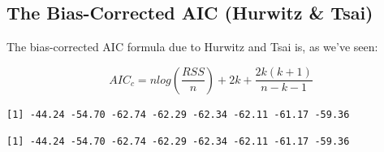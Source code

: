 \documentclass[]{book}
\newenvironment{Shaded}{\begin{snugshade}}{\end{snugshade}}
\newcommand{\KeywordTok}[1]{\textcolor[rgb]{0.13,0.29,0.53}{\textbf{#1}}}
\newcommand{\DecValTok}[1]{\textcolor[rgb]{0.00,0.00,0.81}{#1}}
\newcommand{\StringTok}[1]{\textcolor[rgb]{0.31,0.60,0.02}{#1}}
\newcommand{\CommentTok}[1]{\textcolor[rgb]{0.56,0.35,0.01}{\textit{#1}}}
\newcommand{\OperatorTok}[1]{\textcolor[rgb]{0.81,0.36,0.00}{\textbf{#1}}}
\newcommand{\NormalTok}[1]{#1}
\theoremstyle{definition}
\theoremstyle{definition}
\theoremstyle{definition}
\theoremstyle{remark}
\begin{document}
\subsection{The Bias-Corrected AIC (Hurwitz \&
Tsai)}\label{the-bias-corrected-aic-hurwitz-tsai}

The bias-corrected AIC formula due to Hurwitz and Tsai is, as we've
seen:

\[
AIC_c = n log(\frac{RSS}{n}) + 2k + \frac{2k (k+1)}{n-k-1}
\]

\begin{Shaded}
\end{Shaded}

\begin{verbatim}
[1] -44.24 -54.70 -62.74 -62.29 -62.34 -62.11 -61.17 -59.36
\end{verbatim}

\begin{Shaded}
\end{Shaded}

\begin{verbatim}
[1] -44.24 -54.70 -62.74 -62.29 -62.34 -62.11 -61.17 -59.36
\end{verbatim}
\end{document}
